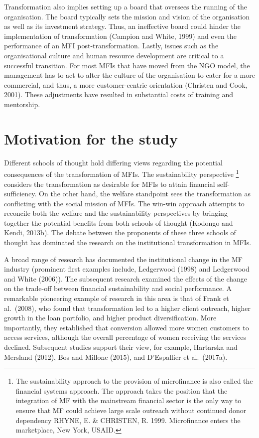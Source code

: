 \documentclass[a4paper, nobind]{templates/ociamthesis}
\begin{document}
Transformation also implies setting up a board that oversees the running of the organisation. The board typically sets the mission and vision of the organisation as well as its investment strategy. Thus, an ineffective board could hinder the implementation of transformation (Campion and White, 1999) and even the performance of an MFI post-transformation. Lastly, issues such as the organisational culture and human resource development are critical to a successful transition. For most MFIs that have moved from the NGO model, the management has to act to alter the culture of the organisation to cater for a more commercial, and thus, a more customer-centric orientation (Christen and Cook, 2001). These adjustments have resulted in substantial costs of training and mentorship.

\hypertarget{motivation-for-the-study}{%
\section{Motivation for the study}\label{motivation-for-the-study}}

\noindent Different schools of thought hold differing views regarding the potential consequences of the transformation of MFIs. The sustainability perspective \footnote{The sustainability approach to the provision of microfinance is also called the financial systems approach. The approach takes the position that the integration of MF with the mainstream financial sector is the only way to ensure that MF could achieve large scale outreach without continued donor dependency RHYNE, E. \& CHRISTEN, R. 1999. Microfinance enters the marketplace, New York, USAID.} considers the transformation as desirable for MFIs to attain financial self-sufficiency. On the other hand, the welfare standpoint sees the transformation as conflicting with the social mission of MFIs. The win-win approach attempts to reconcile both the welfare and the sustainability perspectives by bringing together the potential benefits from both schools of thought (Kodongo and Kendi, 2013b). The debate between the proponents of these three schools of thought has dominated the research on the institutional transformation in MFIs.

A broad range of research has documented the institutional change in the MF industry (prominent first examples include, Ledgerwood (1998) and Ledgerwood and White (2006)). The subsequent research examined the effects of the change on the trade-off between financial sustainability and social performance. A remarkable pioneering example of research in this area is that of Frank et al.~(2008), who found that transformation led to a higher client outreach, higher growth in the loan portfolio, and higher product diversification. More importantly, they established that conversion allowed more women customers to access services, although the overall percentage of women receiving the services declined. Subsequent studies support their view, for example, Hartarska and Mersland (2012), Bos and Millone (2015), and D'Espallier et al.~(2017a).
\end{document}
